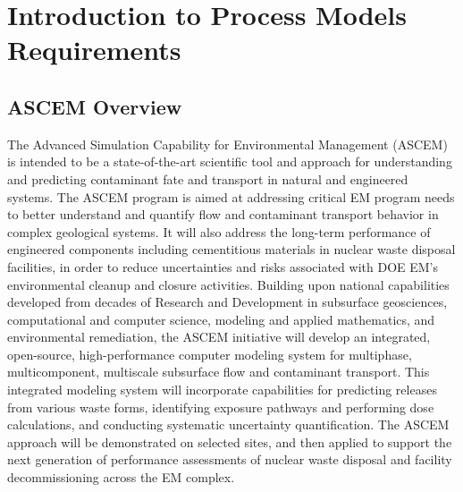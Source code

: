 %
%

\section{Introduction to Process Models Requirements}

\subsection{ASCEM Overview}

The Advanced Simulation Capability for Environmental Management
(ASCEM) is intended to be a state-of-the-art scientific tool and
approach for understanding and predicting contaminant fate and
transport in natural and engineered systems.  
The ASCEM program is aimed at addressing critical EM program needs to
better understand and quantify flow and contaminant transport behavior
in complex geological systems.  It will also address the long-term
performance of engineered components including cementitious materials
in nuclear waste disposal facilities, in order to reduce uncertainties
and risks associated with {DOE EM's} environmental cleanup and closure
activities.  Building upon national capabilities developed from decades
of Research and Development in subsurface geosciences, computational
and computer science, modeling and applied mathematics, and
environmental remediation, the ASCEM initiative will develop an
integrated, open-source, high-performance computer modeling system for
multiphase, multicomponent, multiscale subsurface flow and contaminant
transport.  This integrated modeling system will incorporate
capabilities for predicting releases from various waste forms,
identifying exposure pathways and performing dose calculations, and
conducting systematic uncertainty quantification. The ASCEM approach
will be demonstrated on selected sites, and then applied to support the
next generation of performance assessments of nuclear waste disposal
and facility decommissioning across the EM complex.

